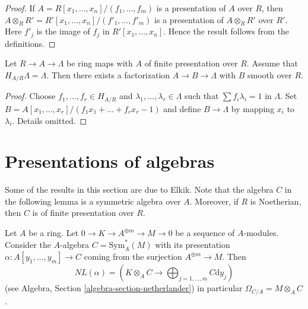 \begin{proof}
If $A = R[x_1, \ldots, x_n]/(f_1, \ldots, f_m)$ is a presentation
of $A$ over $R$, then
$A \otimes_R R' = R'[x_1, \ldots, x_n]/(f'_1, \ldots, f'_m)$
is a presentation of $A \otimes_R R'$ over $R'$. Here $f'_j$ is
the image of $f_j$ in $R'[x_1, \ldots, x_n]$.
Hence the result follows from the definitions.
\end{proof}

\begin{lemma}
\label{lemma-final-solve}
Let $R \to A \to \Lambda$ be ring maps with $A$ of finite presentation
over $R$. Assume that $H_{A/R} \Lambda = \Lambda$. Then there exists
a factorization $A \to B \to \Lambda$ with $B$ smooth over $R$.
\end{lemma}

\begin{proof}
Choose $f_1, \ldots, f_r \in H_{A/R}$ and
$\lambda_1, \ldots, \lambda_r \in \Lambda$ such that
$\sum f_i\lambda_i = 1$ in $\Lambda$. Set
$B = A[x_1, \ldots, x_r]/(f_1x_1 + \ldots + f_rx_r - 1)$
and define $B \to \Lambda$ by mapping $x_i$ to $\lambda_i$.
Details omitted.
\end{proof}





\section{Presentations of algebras}
\label{section-presentations}

\noindent
Some of the results in this section are due to Elkik. Note that the algebra
$C$ in the following lemma is a symmetric algebra over $A$. Moreover, if
$R$ is Noetherian, then $C$ is of finite presentation over $R$.

\begin{lemma}
\label{lemma-cotangent-complex-symmetric-algebra}
Let $A$ be a ring. Let $0 \to K \to A^{\oplus m} \to M \to 0$
be a sequence of $A$-modules. Consider the $A$-algebra
$C = \text{Sym}^*_A(M)$ with its presentation
$\alpha : A[y_1, \ldots, y_m] \to C$
coming from the surjection $A^{\oplus m} \to M$. Then
$$
NL(\alpha) =
(K \otimes_A C \to \bigoplus\nolimits_{j = 1, \ldots, m} C \text{d}y_j)
$$
(see Algebra, Section \ref{algebra-section-netherlander})
in particular $\Omega_{C/A} = M \otimes_A C$.
\end{lemma}

